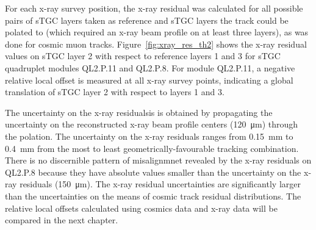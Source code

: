 For each x-ray survey position, the x-ray residual was calculated for all possible pairs of sTGC layers taken as reference and sTGC layers the track could be polated to (which required an x-ray beam profile on at least three layers), as was done for cosmic muon tracks. Figure~\ref{fig:xray_res_th2} shows the x-ray residual values on sTGC layer 2 with respect to reference layers 1 and 3 for sTGC quadruplet modules QL2.P.11 and QL2.P.8.  For module QL2.P.11, a negative relative local offset is measured at all x-ray survey points, indicating a global translation of sTGC layer 2 with respect to layers 1 and 3.

The uncertainty on the x-ray residualsis is obtained by propagating the uncertainty on the reconstructed x-ray beam profile centers (\SI{120}{\micro\meter}) through the polation. The uncertainty on the x-ray residuals ranges from \SI{0.15}{mm} to \SI{0.4}{mm} from the most to least geometrically-favourable tracking combination. There is no discernible pattern of misalignmnet revealed by the x-ray residuals on QL2.P.8 because they have absolute values smaller than the uncertainty on the x-ray residuals (\SI{150}{\micro\meter}). The x-ray residual uncertainties are significantly larger than the uncertainties on the means of cosmic track residual distributions. The relative local offsets calculated using cosmics data and x-ray data will be compared in the next chapter.